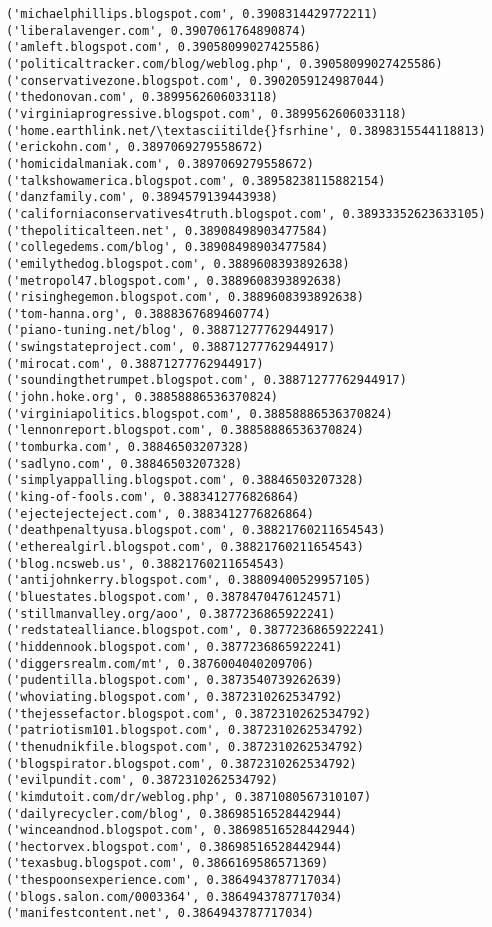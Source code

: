 \documentclass[11pt]{article}
\begin{document}
\begin{Verbatim}[commandchars=\\\{\}]
('michaelphillips.blogspot.com', 0.3908314429772211)
('liberalavenger.com', 0.3907061764890874)
('amleft.blogspot.com', 0.39058099027425586)
('politicaltracker.com/blog/weblog.php', 0.39058099027425586)
('conservativezone.blogspot.com', 0.3902059124987044)
('thedonovan.com', 0.3899562606033118)
('virginiaprogressive.blogspot.com', 0.3899562606033118)
('home.earthlink.net/\textasciitilde{}fsrhine', 0.3898315544118813)
('erickohn.com', 0.3897069279558672)
('homicidalmaniak.com', 0.3897069279558672)
('talkshowamerica.blogspot.com', 0.38958238115882154)
('danzfamily.com', 0.3894579139443938)
('californiaconservatives4truth.blogspot.com', 0.38933352623633105)
('thepoliticalteen.net', 0.38908498903477584)
('collegedems.com/blog', 0.38908498903477584)
('emilythedog.blogspot.com', 0.3889608393892638)
('metropol47.blogspot.com', 0.3889608393892638)
('risinghegemon.blogspot.com', 0.3889608393892638)
('tom-hanna.org', 0.3888367689460774)
('piano-tuning.net/blog', 0.38871277762944917)
('swingstateproject.com', 0.38871277762944917)
('mirocat.com', 0.38871277762944917)
('soundingthetrumpet.blogspot.com', 0.38871277762944917)
('john.hoke.org', 0.38858886536370824)
('virginiapolitics.blogspot.com', 0.38858886536370824)
('lennonreport.blogspot.com', 0.38858886536370824)
('tomburka.com', 0.38846503207328)
('sadlyno.com', 0.38846503207328)
('simplyappalling.blogspot.com', 0.38846503207328)
('king-of-fools.com', 0.3883412776826864)
('ejectejecteject.com', 0.3883412776826864)
('deathpenaltyusa.blogspot.com', 0.38821760211654543)
('etherealgirl.blogspot.com', 0.38821760211654543)
('blog.ncsweb.us', 0.38821760211654543)
('antijohnkerry.blogspot.com', 0.38809400529957105)
('bluestates.blogspot.com', 0.3878470476124571)
('stillmanvalley.org/aoo', 0.3877236865922241)
('redstatealliance.blogspot.com', 0.3877236865922241)
('hiddennook.blogspot.com', 0.3877236865922241)
('diggersrealm.com/mt', 0.3876004040209706)
('pudentilla.blogspot.com', 0.3873540739262639)
('whoviating.blogspot.com', 0.3872310262534792)
('thejessefactor.blogspot.com', 0.3872310262534792)
('patriotism101.blogspot.com', 0.3872310262534792)
('thenudnikfile.blogspot.com', 0.3872310262534792)
('blogspirator.blogspot.com', 0.3872310262534792)
('evilpundit.com', 0.3872310262534792)
('kimdutoit.com/dr/weblog.php', 0.3871080567310107)
('dailyrecycler.com/blog', 0.38698516528442944)
('winceandnod.blogspot.com', 0.38698516528442944)
('hectorvex.blogspot.com', 0.38698516528442944)
('texasbug.blogspot.com', 0.3866169586571369)
('thespoonsexperience.com', 0.3864943787717034)
('blogs.salon.com/0003364', 0.3864943787717034)
('manifestcontent.net', 0.3864943787717034)

\end{Verbatim}
\end{document}
